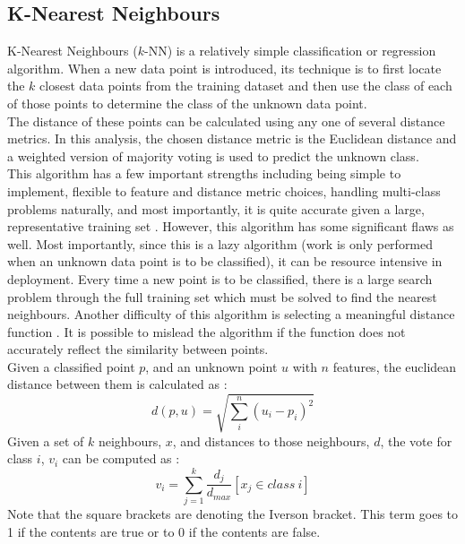 \documentclass[titlepage]{article}
\begin{document}
\subsection{K-Nearest Neighbours}
K-Nearest Neighbours ($k$-NN) is a relatively simple classification or regression algorithm. When a new data point is introduced, its technique is to first locate the $k$ closest data points from the training dataset and then use the class of each of those points to determine the class of the unknown data point.\\
The distance of these points can be calculated using any one of several distance metrics. In this analysis, the chosen distance metric is the Euclidean distance and a weighted version of majority voting is used to predict the unknown class.\\
This algorithm has a few important strengths including being simple to implement, flexible to feature and distance metric choices, handling multi-class problems naturally, and most importantly, it is quite accurate given a large, representative training set \cite{KNN}. However, this algorithm has some significant flaws as well. Most importantly, since this is a lazy algorithm (work is only performed when an unknown data point is to be classified), it can be resource intensive in deployment. Every time a new point is to be classified, there is a large search problem through the full training set which must be solved to find the nearest neighbours. Another difficulty of this algorithm is selecting a meaningful distance function \cite{KNN}. It is possible to mislead the algorithm if the function does not accurately reflect the similarity between points.\\
Given a classified point $p$, and an unknown point $u$ with $n$ features, the euclidean distance between them is calculated as \cite{KNN}: 
$$d(p, u) = \sqrt{\sum\limits_i^n(u_i - p_i)^2}$$
Given a set of $k$ neighbours, $x$, and distances to those neighbours, $d$, the vote for class $i$, $v_i$ can be computed as \cite{KNN}:
$$v_i = \sum\limits_{j=1}^{k} \frac{d_j}{d_{max}} \left[x_j \in class~i\right]$$
Note that the square brackets are denoting the Iverson bracket. This term goes to 1 if the contents are true or to 0 if the contents are false.
\end{document}
